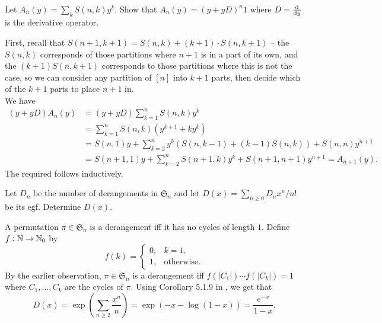 		\begin{problem}
			Let $A_n(y) = \sum_{k} S(n,k) y^k$. Show that $A_n(y) = (y + yD)^n1$ where $D = \od{}{y}$ is the derivative operator.
		\end{problem}
		\begin{solution*}
			First, recall that $S(n+1,k+1) = S(n,k) + (k+1) \cdot S(n,k+1)$ -- the $S(n,k)$ corresponds of those partitions where $n+1$ is in a part of its own, and the $(k+1)S(n,k+1)$ corresponds to those partitions where this is not the case, so we can consider any partition of $[n]$ into $k+1$ parts, then decide which of the $k+1$ parts to place $n+1$ in.\\
			We have
			\begin{align*}
				(y+yD)A_n(y) &= (y+yD) \sum_{k=1}^n S(n,k) y^k \\
					&= \sum_{k=1}^n S(n,k) (y^{k+1} + ky^k) \\
					&= S(n,1) y + \sum_{k=2}^{n} y^k (S(n,k-1) + (k-1) S(n,k)) + S(n,n) y^{n+1} \\
					&= S(n+1,1) y + \sum_{k=2}^n S(n+1,k) y^k + S(n+1,n+1) y^{n+1} = A_{n+1}(y).
			\end{align*}
			The required follows inductively.
		\end{solution*}

		\begin{problem}
			Let $D_n$ be the number of derangements in $\mathfrak{S}_n$ and let $D(x) = \sum_{n \ge 0} D_n x^n/n!$ be its egf. Determine $D(x)$.
		\end{problem}
		\begin{solution*}
			A permutation $\pi \in \mathfrak{S}_n$ is a derangement iff it has no cycles of length $1$. Define $f : \mathbb{N} \to \mathbb{N}_0$ by
			\[ f(k) = \begin{cases} 0 , & k = 1, \\ 1 , & \text{otherwise.} \end{cases} \]
			By the earlier observation, $\pi \in \mathfrak{S}_n$ is a derangement iff $f(|C_1|)\cdots f(|C_k|) = 1$ where $C_1,\ldots,C_k$ are the cycles of $\pi$.
			Using Corollary 5.1.9 in \cite{ec2}, we get that
			\[ D(x) = \exp \left(\sum_{n \ge 2} \frac{x^n}{n}\right) = \exp \left( -x - \log(1-x) \right) = \frac{e^{-x}}{1-x} . \]
		\end{solution*}

